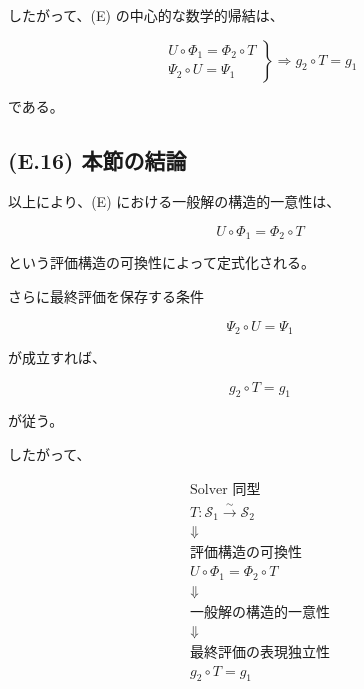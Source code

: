 \documentclass[a4paper,11pt]{article}
\newcommand{\Solver}{\mathcal{S}}
\begin{document}
したがって、(E) の中心的な数学的帰結は、

\begin{equation}
    \boxed{
        \left.
        \begin{array}{c}
            U\circ\Phi_1
            =
            \Phi_2\circ T
            \\[2mm]
            \Psi_2\circ U
            =
            \Psi_1
        \end{array}
        \right\}
        \Longrightarrow
        g_2\circ T=g_1
    }
\end{equation}

である。


\subsection{(E.16) 本節の結論}
\label{subsec:E16}

以上により、(E) における一般解の構造的一意性は、

\begin{equation}
    \boxed{
        U\circ\Phi_1
        =
        \Phi_2\circ T
    }
\end{equation}

という評価構造の可換性によって定式化される。

さらに最終評価を保存する条件

\begin{equation}
    \boxed{
        \Psi_2\circ U
        =
        \Psi_1
    }
\end{equation}

が成立すれば、

\begin{equation}
    \boxed{
        g_2\circ T
        =
        g_1
    }
\end{equation}

が従う。

したがって、

\begin{equation}
    \boxed{
    \begin{array}{c}
        \text{Solver 同型}\\
        T:\Solver_1\overset{\sim}{\longrightarrow}\Solver_2
        \\[2mm]
        \Downarrow
        \\[2mm]
        \text{評価構造の可換性}\\
        U\circ\Phi_1=\Phi_2\circ T
        \\[2mm]
        \Downarrow
        \\[2mm]
        \text{一般解の構造的一意性}
        \\[2mm]
        \Downarrow
        \\[2mm]
        \text{最終評価の表現独立性}\\
        g_2\circ T=g_1
    \end{array}
    }
\end{equation}
\end{document}
